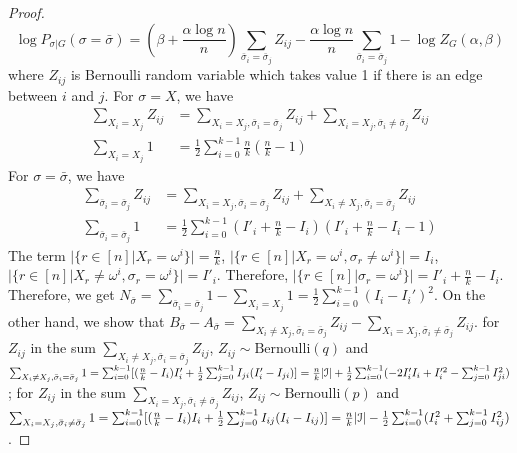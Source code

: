\documentclass{article}
\begin{document}
\begin{proof}
	$$ \log P_{\sigma|G}(\sigma=\bar{\sigma}) = (\beta + \frac{\alpha \log n}{n}) \sum_{\bar{\sigma}_i = \bar{\sigma}_j} Z_{ij}
	- \frac{\alpha \log n}{n} \sum_{\bar{\sigma}_i = \bar{\sigma}_j} 1  - \log Z_G(\alpha, \beta)
	$$
	where $Z_{ij}$ is Bernoulli random variable which takes value 1 if there is an edge between $i$ and $j$.
	For $\sigma = X$, we have
	\begin{align*}
	\sum_{X_i = X_j} Z_{ij} &= \sum_{X_i = X_j, \bar{\sigma}_i = \bar{\sigma}_j} Z_{ij} + \sum_{X_i = X_j, \bar{\sigma}_i \neq \bar{\sigma}_j} Z_{ij} \\
	\sum_{X_i = X_j} 1 &= \frac{1}{2} \sum_{i=0}^{k-1} \frac{n}{k} ( \frac{n}{k} - 1 )
	\end{align*}
	For $\sigma = \bar{\sigma}$, we have
	\begin{align*}
	\sum_{\bar{\sigma}_i = \bar{\sigma}_j} Z_{ij} &= \sum_{X_i = X_j, \bar{\sigma}_i = \bar{\sigma}_j} Z_{ij} + \sum_{X_i \neq X_j, \bar{\sigma}_i = \bar{\sigma}_j} Z_{ij} \\
	\sum_{\bar{\sigma}_i = \bar{\sigma}_j} 1 &= \frac{1}{2} \sum_{i=0}^{k-1} (I'_i + \frac{n}{k} - I_i) ( I'_i + \frac{n}{k} - I_i - 1)
	\end{align*}
	The term $|\{r\in [n] | X_r = \omega^i \}| = \frac{n}{k}$,
	$|\{r\in [n] | X_r = \omega^i, \sigma_r \neq \omega^i \}| = I_i$,
	$|\{r\in [n] | X_r \neq \omega^i, \sigma_r = \omega^i \}| = I'_i$.
	Therefore,  $|\{r\in [n] | \sigma_r = \omega^i \}| = I'_i + \frac{n}{k} - I_i $.
	Therefore, we get
	$N_{\bar{\sigma}} = \sum_{\bar{\sigma}_i = \bar{\sigma}_j} 1  -\sum_{X_i = X_j} 1 = \frac{1}{2}\sum_{i=0}^{k-1} (I_i - I_i')^2 $.
	On the other hand, we show that $B_{\bar{\sigma}} - A_{\bar{\sigma}} = \sum_{X_i \neq X_j, \bar{\sigma}_i = \bar{\sigma}_j} Z_{ij} - \sum_{X_i = X_j, \bar{\sigma}_i \neq \bar{\sigma}_j} Z_{ij}$.
	for $Z_{ij}$ in the sum $\sum_{X_i \neq X_j, \bar{\sigma}_i = \bar{\sigma}_j} Z_{ij}$, $Z_{ij} \sim \textrm{Bernoulli}(q)$ and
	$\sum_{X_i \neq X_j, \bar{\sigma}_i = \bar{\sigma}_j} 1 = \sum_{i=0}^{k-1}[(\frac{n}{k} - I_i) I_i' + \frac{1}{2} \sum_{j=0}^{k-1} I_{ji}(I'_i - I_{ji}) ]
	=\frac{n}{k}|\mathcal{I}| + \frac{1}{2}\sum_{i=0}^{k-1}  (-2 I'_i I_i  + I'^2_i - \sum_{j=0}^{k-1} I^2_{ji}) $;
	for $Z_{ij}$ in the sum $\sum_{X_i = X_j, \bar{\sigma}_i \neq \bar{\sigma}_j} Z_{ij}$, $Z_{ij} \sim \textrm{Bernoulli}(p)$ and
	$\sum_{X_i = X_j, \bar{\sigma}_i \neq \bar{\sigma}_j} 1
	= \sum_{i=0}^{k-1}[(\frac{n}{k} - I_i) I_i + \frac{1}{2} \sum_{j=0}^{k-1} I_{ij}(I_i - I_{ij}) ] 
	= \frac{n}{k}|\mathcal{I}| - \frac{1}{2}\sum_{i=0}^{k-1}  (I^2_i + \sum_{j=0}^{k-1} I^2_{ij})$.
\end{proof}
\end{document}
